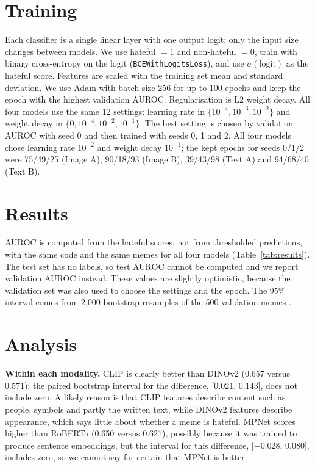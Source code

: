 \documentclass[compactaffiliation]{Interspeech}
\begin{document}
\section{Training}
Each classifier is a single linear layer with one output logit; only the input size changes between
models. We use hateful $=1$ and non-hateful $=0$, train with binary cross-entropy on the logit
(\texttt{BCEWithLogitsLoss}), and use $\sigma(\text{logit})$ as the hateful score. Features are
scaled with the training set mean and standard deviation. We use Adam \cite{kingma2015adam} with
batch size 256 for up to 100 epochs and keep the epoch with the highest validation AUROC.
Regularisation is L2 weight decay. All four models use the same 12 settings: learning rate in
$\{10^{-4},10^{-3},10^{-2}\}$ and weight decay in $\{0,10^{-4},10^{-2},10^{-1}\}$. The best setting is
chosen by validation AUROC with seed 0 and then trained with seeds 0, 1 and 2. All four models chose
learning rate $10^{-2}$ and weight decay $10^{-1}$; the kept epochs for seeds 0/1/2 were 75/49/25
(Image A), 90/18/93 (Image B), 39/43/98 (Text A) and 94/68/40 (Text B).

\section{Results}
AUROC is computed from the hateful scores, not from thresholded predictions, with the same code and
the same memes for all four models (Table~\ref{tab:results}). The test set has no labels, so test AUROC
cannot be computed and we report validation AUROC instead. These values are slightly optimistic,
because the validation set was also used to choose the settings and the epoch. The 95\% interval
comes from 2{,}000 bootstrap resamples of the 500 validation memes \cite{efron1993bootstrap}.



\section{Analysis}
\textbf{Within each modality.} CLIP is clearly better than DINOv2 (0.657 versus 0.571); the paired
bootstrap interval for the difference, [0.021, 0.143], does not include zero. A likely reason is
that CLIP features describe content such as people, symbols and partly the written text, while
DINOv2 features describe appearance, which says little about whether a meme is hateful. MPNet
scores higher than RoBERTa (0.650 versus 0.621), possibly because it was trained to produce sentence
embeddings, but the interval for this difference, [$-$0.028, 0.080], includes zero, so we cannot say
for certain that MPNet is better.
\end{document}
